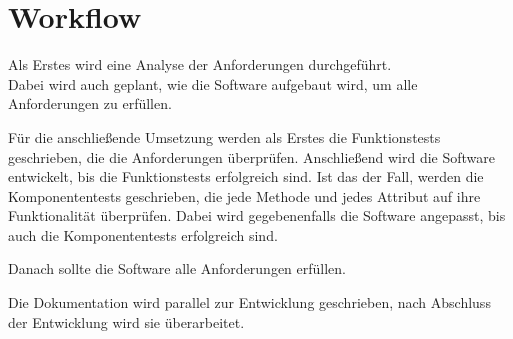 \chapter{Workflow}

Als Erstes wird eine Analyse der Anforderungen durchgeführt.\\
Dabei wird auch geplant, wie die Software aufgebaut wird, um alle Anforderungen zu erfüllen.

Für die anschließende Umsetzung werden als Erstes die Funktionstests geschrieben, die die Anforderungen überprüfen.
Anschließend wird die Software entwickelt, bis die Funktionstests erfolgreich sind.
Ist das der Fall, werden die Komponententests geschrieben, die jede Methode und jedes Attribut auf ihre Funktionalität überprüfen.
Dabei wird gegebenenfalls die Software angepasst, bis auch die Komponententests erfolgreich sind.

Danach sollte die Software alle Anforderungen erfüllen.

Die Dokumentation wird parallel zur Entwicklung geschrieben, nach Abschluss der Entwicklung wird sie überarbeitet.

